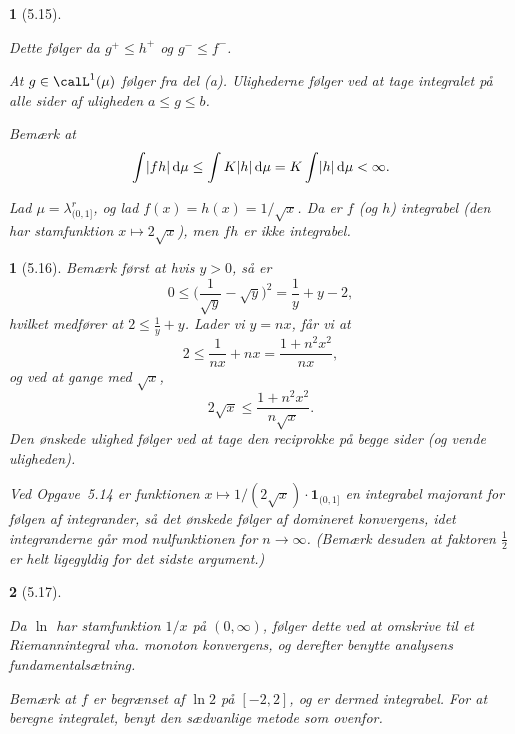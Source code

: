 \documentclass[a4paper, 11pt, article, danish, oneside]{memoir}
\newcommand{\blank}{\mathrel{\;\cdot\;}}
\newcommand{\blankifempty}[1]{\ifstrempty{#1}{\blank}{#1}}
\DeclarePairedDelimiter{\auxdelimlvert}{\lvert}{\rvert}
\newcommand{\abs}[1]{\auxdelimlvert{\blankifempty{#1}}}
\newcommand{\dif}{\mathop{}\!\mathrm{d}}
\newcommand{\indicator}[1]{\mathbf{1}_{#1}}
\newcommand{\pencilsymbol}{\raisebox{-2pt}{\normalfont\PencilLeft}}
\theoremstyle{changedotcustomnumber}
\newtheorem{opgave}{\pencilsymbol}
\theoremstyle{changedotbreakcustomnumber}
\newtheorem{opgavebreak}{\pencilsymbol}
\begin{document}
\begin{opgavebreak}[5.15]
\begin{solutionsec}
    \item Dette følger da $g^+ \leq h^+$ og $g^- \leq f^-$.

    \item At $g \in \calL^1(\mu)$ følger fra del (a). Ulighederne følger ved at tage integralet på alle sider af uligheden $a \leq g \leq b$.

    \item Bemærk at
    \begin{equation*}
        \int \abs{fh} \dif\mu
            \leq \int K \abs{h} \dif\mu
            = K \int \abs{h} \dif\mu
            < \infty.
    \end{equation*}

    \item Lad $\mu = \lambda^r_{(0,1]}$, og lad $f(x) = h(x) = 1/\sqrt{x}$. Da er $f$ (og $h$) integrabel (den har stamfunktion $x \mapsto 2\sqrt{x}$), men $fh$ er ikke integrabel.
\end{solutionsec}
\end{opgavebreak}


\begin{opgave}[5.16]
    Bemærk først at hvis $y > 0$, så er
    \begin{equation*}
        0
            \leq \biggl( \frac{1}{\sqrt{y}} - \sqrt{y} \biggr)^2
            = \frac{1}{y} + y - 2,
    \end{equation*}
    hvilket medfører at $2 \leq \frac{1}{y} + y$. Lader vi $y = nx$, får vi at
    \begin{equation*}
        2
            \leq \frac{1}{nx} + nx
            = \frac{1 + n^2 x^2}{nx},
    \end{equation*}
    og ved at gange med $\sqrt{x}$,
    \begin{equation*}
        2\sqrt{x}
            \leq \frac{1 + n^2 x^2}{n\sqrt{x}}.
    \end{equation*}
    Den ønskede ulighed følger ved at tage den reciprokke på begge sider (og vende uligheden).

    Ved Opgave~5.14 er funktionen $x \mapsto 1/(2\sqrt{x}) \cdot \indicator{(0,1]}$ en integrabel majorant for følgen af integrander, så det ønskede følger af domineret konvergens, idet integranderne går mod nulfunktionen for $n \to \infty$. (Bemærk desuden at faktoren $\frac{1}{2}$ er helt ligegyldig for det sidste argument.)
\end{opgave}


\begin{opgavebreak}[5.17]
\begin{solutionsec}
    \item Da $\ln$ har stamfunktion $1/x$ på $(0,\infty)$, følger dette ved at omskrive til et Riemannintegral vha. monoton konvergens, og derefter benytte analysens fundamentalsætning.

    \item Bemærk at $f$ er begrænset af $\ln 2$ på $[-2,2]$, og er dermed integrabel. For at beregne integralet, benyt den sædvanlige metode som ovenfor.
\end{solutionsec}
\end{opgavebreak}
\end{document}
